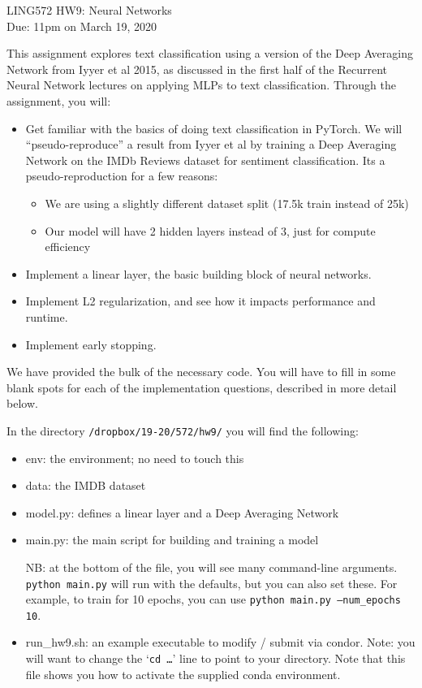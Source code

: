 \documentclass[11pt]{article}
\begin{document}
\begin{center}
\LARGE
LING572 HW9: Neural Networks\\
Due: 11pm on March 19, 2020\\
\vspace{0.3in}
\end{center}

This assignment explores text classification using a version of the Deep Averaging Network from Iyyer et al 2015, as discussed in the first half of the Recurrent Neural Network lectures on applying MLPs to text classification.  Through the assignment, you will:
\begin{itemize}
	\item Get familiar with the basics of doing text classification in PyTorch.  We will ``pseudo-reproduce'' a result from Iyyer et al by training a Deep Averaging Network on the IMDb Reviews dataset for sentiment classification.  Its a pseudo-reproduction for a few reasons:
		\begin{itemize}
			\item We are using a slightly different dataset split (17.5k train instead of 25k)
			\item Our model will have 2 hidden layers instead of 3, just for compute efficiency
		\end{itemize}
	\item Implement a linear layer, the basic building block of neural networks.
	\item Implement L2 regularization, and see how it impacts performance and runtime.
	\item Implement early stopping.
\end{itemize}
We have provided the bulk of the necessary code.  You will have to fill in some blank spots for each of the implementation questions, described in more detail below.

In the directory \texttt{/dropbox/19-20/572/hw9/} you will find the following:
\begin{itemize}
	\item env: the environment; no need to touch this
	\item data: the IMDB dataset
	\item model.py: defines a linear layer and a Deep Averaging Network
	\item main.py: the main script for building and training a model

		NB: at the bottom of the file, you will see many command-line arguments.  \texttt{python main.py} will run with the defaults, but you can also set these.  For example, to train for 10 epochs, you can use \texttt{python main.py --num\_epochs 10}.
	\item run\_hw9.sh: an example executable to modify / submit via condor.  Note: you will want to change the `\texttt{cd \ldots}' line to point to your directory. Note that this file shows you how to activate the supplied conda environment.
\end{itemize}
\end{document}

